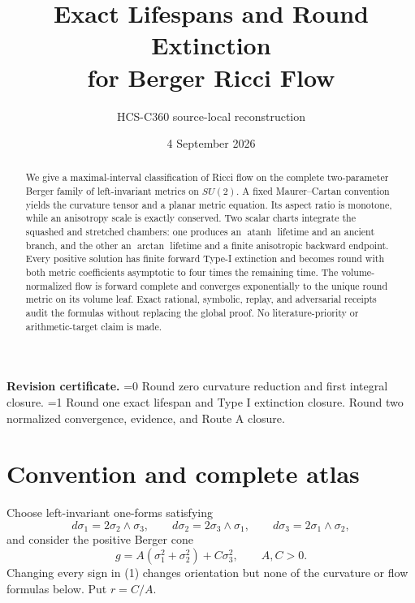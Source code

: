 \documentclass[10pt]{article}
\title{Exact Lifespans and Round Extinction\\
for Berger Ricci Flow}
\author{HCS-C360 source-local reconstruction}
\date{4 September 2026}
\providecommand{\CRevisionRound}{2}
\theoremstyle{remark}
\begin{document}
\maketitle

\begin{abstract}
We give a maximal-interval classification of Ricci flow on the complete
two-parameter Berger family of left-invariant metrics on $SU(2)$.  A fixed
Maurer--Cartan convention yields the curvature tensor and a planar metric
equation.  Its aspect ratio is monotone, while an anisotropy scale is exactly
conserved.  Two scalar charts integrate the squashed and stretched chambers:
one produces an \(\operatorname{atanh}\) lifetime and an ancient branch, and
the other an \(\arctan\) lifetime and a finite anisotropic backward endpoint.
Every positive solution has finite forward Type-I extinction and becomes
round with both metric coefficients asymptotic to four times the remaining
time.  The volume-normalized flow is forward complete and converges
exponentially to the unique round metric on its volume leaf.  Exact rational,
symbolic, replay, and adversarial receipts audit the formulas without replacing
the global proof.  No literature-priority or arithmetic-target claim is made.
\end{abstract}

\noindent\textbf{Revision certificate.}
\ifnum\CRevisionRound=0
Round zero curvature reduction and first integral closure.
\else\ifnum\CRevisionRound=1
Round one exact lifespan and Type I extinction closure.
\else
Round two normalized convergence, evidence, and Route A closure.
\fi\fi

\small
\section{Convention and complete atlas}

Choose left-invariant one-forms satisfying
\begin{equation}
 d\sigma_1=2\sigma_2\wedge\sigma_3,
 \qquad d\sigma_2=2\sigma_3\wedge\sigma_1,
 \qquad d\sigma_3=2\sigma_1\wedge\sigma_2,
\end{equation}
and consider the positive Berger cone
\begin{equation}
 g=A(\sigma_1^2+\sigma_2^2)+C\sigma_3^2,
 \qquad A,C>0.                                      \label{eq:metric}
\end{equation}
Changing every sign in (1) changes orientation but none of the curvature
or flow formulas below.  Put $r=C/A$.
\end{document}

